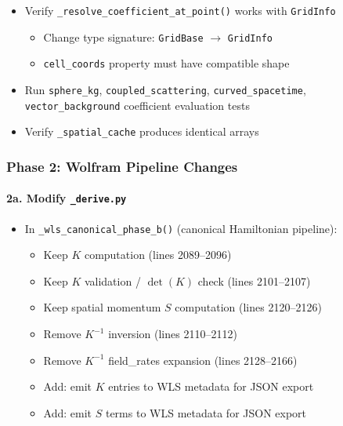 \begin{itemize}
  \item[$\square$] Verify \texttt{\_resolve\_coefficient\_at\_point()} works with \texttt{GridInfo}
  \begin{itemize}
    \item Change type signature: \texttt{GridBase} $\to$ \texttt{GridInfo}
    \item \texttt{cell\_coords} property must have compatible shape
  \end{itemize}
  \item[$\square$] Run \texttt{sphere\_kg}, \texttt{coupled\_scattering}, \texttt{curved\_spacetime}, \texttt{vector\_background}
    coefficient evaluation tests
  \item[$\square$] Verify \texttt{\_spatial\_cache} produces identical arrays
\end{itemize}

\subsubsection{Phase 2: Wolfram Pipeline Changes}
\label{sec:phase2}

\paragraph{2a. Modify \texttt{\_derive.py}}
\label{par:modify-derive}

\begin{itemize}
  \item[$\square$] In \texttt{\_wls\_canonical\_phase\_b()} (canonical Hamiltonian pipeline):
  \begin{itemize}
    \item Keep $K$ computation (lines 2089--2096)
    \item Keep $K$ validation / $\det(K)$ check (lines 2101--2107)
    \item Keep spatial momentum $S$ computation (lines 2120--2126)
    \item Remove $K^{-1}$ inversion (lines 2110--2112)
    \item Remove $K^{-1}$ field\_rates expansion (lines 2128--2166)
    \item Add: emit $K$ entries to WLS metadata for JSON export
    \item Add: emit $S$ terms to WLS metadata for JSON export
  \end{itemize}
\end{itemize}

